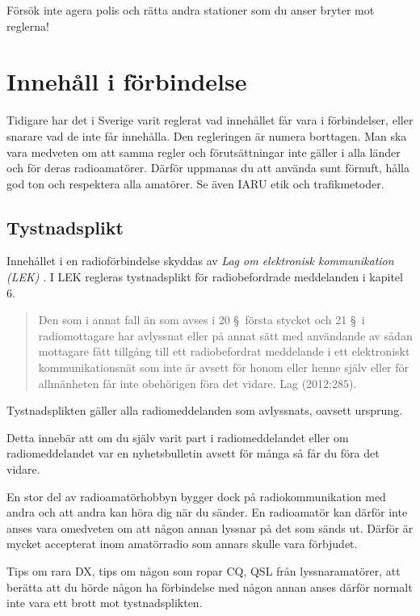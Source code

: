 Försök inte agera polis och rätta andra stationer som du anser bryter mot reglerna!

\section{Innehåll i förbindelse}
\label{innehåll i förbindelse}

Tidigare har det i Sverige varit reglerat vad innehållet får vara i
förbindelser, eller snarare vad de inte får innehålla.
Den regleringen är numera borttagen.
Man ska vara medveten om att samma regler och förutsättningar inte gäller i
alla länder och för deras radioamatörer.
Därför uppmanas du att använda sunt förnuft, hålla god ton och respektera alla
amatörer.
Se även IARU etik och trafikmetoder.

\subsection{Tystnadsplikt}

Innehållet i en radioförbindelse skyddas av
\emph{Lag om elektronisk kommunikation (LEK)} \cite{SFS2003:389}.
I LEK regleras tystnadsplikt för radiobefordrade meddelanden i kapitel 6.

\begin{quote}
	Den som i annat fall än som avses i 20 \S~första stycket och 21 \S~i
	radiomottagare har avlyssnat eller på annat sätt med användande av sådan
	mottagare fått tillgång till ett radiobefordrat meddelande i ett
	elektroniskt kommunikationsnät som inte är avsett för honom eller henne
	själv eller för allmänheten får inte obehörigen föra det vidare.
	Lag (2012:285).\cite[kap 6, \S23]{SFS2003:389}
\end{quote}

Tystnadsplikten gäller alla radiomeddelanden som avlyssnats, oavsett ursprung.

Detta innebär att om du själv varit part i radiomeddelandet eller om
radiomeddelandet var en nyhetsbulletin avsett för många så får du föra det vidare.

En stor del av radioamatörhobbyn bygger dock på radiokommunikation med andra och
att andra kan höra dig när du sänder.
En radioamatör kan därför inte anses vara omedveten om att någon annan lyssnar
på det som sänds ut.
Därför är mycket accepterat inom amatörradio som annars skulle vara förbjudet.

Tips om rara DX, tips om någon som ropar CQ, QSL från lyssnaramatörer, att
berätta att du hörde någon ha förbindelse med någon annan anses därför normalt
inte vara ett brott mot tystnadsplikten.

